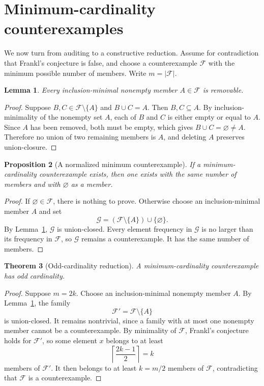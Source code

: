 \documentclass[11pt]{amsart}
\newtheorem{theorem}{Theorem}[section]
\newtheorem{proposition}[theorem]{Proposition}
\newtheorem{lemma}[theorem]{Lemma}
\theoremstyle{definition}
\theoremstyle{remark}
\newcommand{\F}{\mathcal F}
\newcommand{\G}{\mathcal G}
\begin{document}
\section{Minimum-cardinality counterexamples}\label{sec:minimal}

We now turn from auditing to a constructive reduction. Assume for contradiction that Frankl's conjecture is false, and choose a counterexample $\F$ with the minimum possible number of members. Write $m=|\F|$.

\begin{lemma}\label{lem:minimal-member-removable}
Every inclusion-minimal nonempty member $A\in\F$ is removable.
\end{lemma}

\begin{proof}
Suppose $B,C\in\F\setminus\{A\}$ and $B\cup C=A$. Then $B,C\subseteq A$. By inclusion-minimality of the nonempty set $A$, each of $B$ and $C$ is either empty or equal to $A$. Since $A$ has been removed, both must be empty, which gives $B\cup C=\varnothing\ne A$. Therefore no union of two remaining members is $A$, and deleting $A$ preserves union-closure.
\end{proof}

\begin{proposition}[A normalized minimum counterexample]\label{prop:empty-normalization}
If a minimum-cardinality counterexample exists, then one exists with the same number of members and with $\varnothing$ as a member.
\end{proposition}

\begin{proof}
If $\varnothing\in\F$, there is nothing to prove. Otherwise choose an inclusion-minimal member $A$ and set
\[
  \G=(\F\setminus\{A\})\cup\{\varnothing\}.
\]
By Lemma~\ref{lem:minimal-member-removable}, $\G$ is union-closed. Every element frequency in $\G$ is no larger than its frequency in $\F$, so $\G$ remains a counterexample. It has the same number of members.
\end{proof}

\begin{theorem}[Odd-cardinality reduction]\label{thm:odd}
A minimum-cardinality counterexample has odd cardinality.
\end{theorem}

\begin{proof}
Suppose $m=2k$. Choose an inclusion-minimal nonempty member $A$. By Lemma~\ref{lem:minimal-member-removable}, the family
\[
  \F'=\F\setminus\{A\}
\]
is union-closed. It remains nontrivial, since a family with at most one nonempty member cannot be a counterexample. By minimality of $\F$, Frankl's conjecture holds for $\F'$, so some element $x$ belongs to at least
\[
  \left\lceil\frac{2k-1}{2}\right\rceil=k
\]
members of $\F'$. It then belongs to at least $k=m/2$ members of $\F$, contradicting that $\F$ is a counterexample.
\end{proof}
\end{document}
